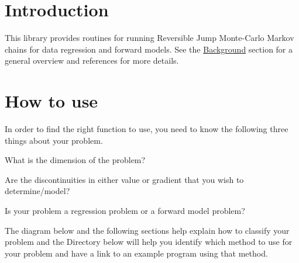 \hypertarget{index_Introduction}{}\section{Introduction}\label{index_Introduction}
This library provides routines for running Reversible Jump Monte-\/\+Carlo Markov chains for data regression and forward models. See the \hyperlink{background}{Background} section for a general overview and references for more details.\hypertarget{index_How}{}\section{How to use}\label{index_How}
In order to find the right function to use, you need to know the following three things about your problem.


\begin{DoxyItemize}
\item What is the dimension of the problem?
\item Are the discontinuities in either value or gradient that you wish to determine/model?
\item Is your problem a regression problem or a forward model problem?
\end{DoxyItemize}

The diagram below and the following sections help explain how to classify your problem and the Directory below will help you identify which method to use for your problem and have a link to an example program using that method.

